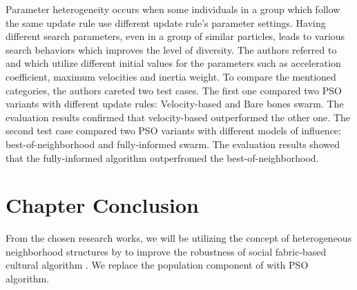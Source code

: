 Parameter heterogeneity occurs when some individuals in a group which follow the same update rule use different update rule's parameter settings. Having different search parameters, even in a group of similar particles, leads to various search behaviors which improves the level of diversity. The authors referred to \citet{mendes2004population} and \citet{montes2008convergence} which utilize different initial values for the parameters such as acceleration coefficient, maximum velocities and inertia weight.\newline
To compare the mentioned categories, the authors careted two test cases. The first one compared two PSO variants with different update rules: Velocity-based and Bare bones swarm. The evaluation results confirmed that velocity-based outperformed the other one. The second test case compared two PSO variants with different models of influence: best-of-neighborhood and fully-informed swarm. The evaluation results showed that the fully-informed algorithm outperfromed the best-of-neighborhood.

\section{Chapter Conclusion}
From the chosen research works, we will be utilizing the concept of heterogeneous neighborhood structures by \citet{de2009heterogeneous} to improve the robustness of social fabric-based cultural algorithm \citet{ali2016leveraged}. We replace the population component of \citet{ali2016leveraged} with PSO algorithm.


